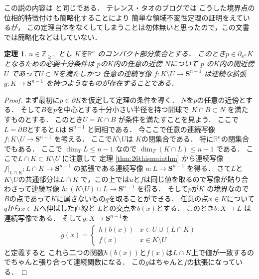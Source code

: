 \documentclass[leqno, a4paper, 12pt]{jsarticle}
\newtheorem{thm}{定理}
\newcommand{\zz}{\mathbb{Z}}
\newcommand{\rr}{\mathbb{R}}
\newcommand{\mysphere}[1]{\mathbf{S}^{#1}}
\begin{document}
この説の内容は
\cite{dempa3}と同じである．
テレンス・タオ\cite{tao}のブログでは
こうした境界点の位相的特徴付けも簡略化することにより
簡単な領域不変性定理の証明をえているが，
この定理自体をなくしてしまうことは勿体無いと思ったので，この文書では簡略化などはしていない．
\begin{thm}\label{thm:26junbidaiji}
$n\in \zz_{\ge 1}$
とし
$K$を$\rr^{n}$
のコンパクト部分集合とする．
このとき$p\in \partial_{\rr^{n}} K$
となるための必要十分条件は
$p$の$K$内の任意の近傍
$N$について
$p$
の$K$内の開近傍$U$
であって$U\subset N$を満たしかつ
任意の連続写像
$f\colon K\setminus U\to \mysphere{n-1}$
は連続な拡張$g\colon K\to \mysphere{n-1}$
を持つようなものが存在することである．
\end{thm}
\begin{proof}
まず最初に$p\in \partial K$を仮定して定理の条件を導く．
$N$を$p$の任意の近傍とする．
そして$B$を$p$を中心とする十分小さい半径を持つ開球で
$K\cap B\subset N$
を満たすものとする．
このとき$U=K\cap B$
が条件を満たすことを見よう．
ここで$L=\partial B$とすると$L$は
$\mysphere{n-1}$
と同相である．
今ここで任意の連続写像
$f\colon K\setminus U\to \mysphere{n-1}$
を考える．
ここで$K\setminus U$は
$K$の閉集合である．
特に$\rr^{n}$の閉集合でもある．
ここで
$\dim_{T}L\le n-1$
なので
$\dim_{T}(K\cap L)\le n-1$
である．
ここで$L\cap K\subset K\setminus U$
に注意して
定理
\ref{thm:26thismainthm}
から連続写像
$f|_{L\cap K}\colon L\cap K\to \mysphere{n-1}$
の拡張である連続写像
$u\colon L\to \mysphere{n-1}$
を得る．
さて$L$と$K\setminus U$の共通部分は$L\cap K$
で，この上では$u$と$f$は同じ値を取るので写像が貼り合わさって連続写像
$h\colon (K\setminus U)\cup L\to \mysphere{n-1}$
を得る．
そして$p$が$K$
の境界なので
$B$の点であって$K$に属さないもの$q$を取ることができる．
任意の点$x\in K$について
$q$から$x\in K$へ伸ばした直線と
$L$との交点を$b(x)$とする．
このとき$b\colon X\to L$
は連続写像である．
そして$g\colon X\to \mysphere{n-1}$を
\begin{align*}
g(x)
=
\begin{cases}
h(b(x)) & \text{$x\in U\cup (L\cap K)$}\\
f(x) & \text{$x\in K\setminus U$}
\end{cases}
\end{align*}
と定義すると
これら二つの関数$h(b(x))$と$f(x)$は$L\cap K$上で値が一致するのでちゃんと張り合って連続関数になる．
この$g$はちゃんと$f$の拡張になっている．


\end{proof}
\end{document}
